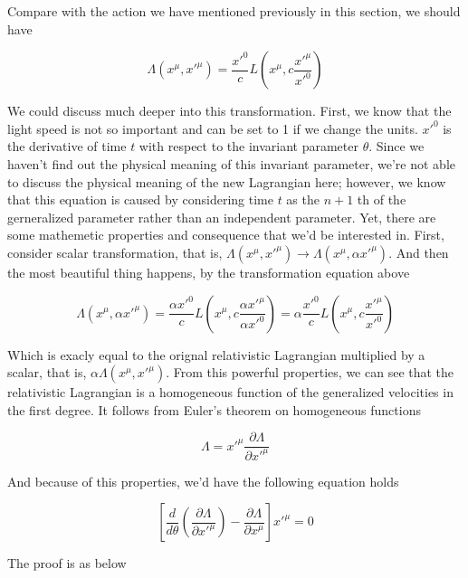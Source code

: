 \documentclass[12pt]{article}
\begin{document}
Compare with the action we have mentioned previously in this section, we should have

\begin{center}
    \[ \Lambda(x^{\mu}, x'^{\mu}) = \frac{x'^{0}}{c} L(x^{\mu}, c\frac{x'^{\mu}}{x'^{0}}) \]
\end{center}

We could discuss much deeper into this transformation. First, we know that the light speed is not so important and can be set to 1 if we change the units.
$x'^0$ is the derivative of time $t$ with respect to the invariant parameter $\theta$. Since we haven't find out the physical meaning of this invariant parameter, we're not able to discuss the physical meaning of the new Lagrangian here; however, we know that this equation is caused by considering time $t$ as the $n+1$ th of the gerneralized parameter rather than an independent parameter. Yet, there are some mathemetic properties and consequence that we'd be interested in. First, consider scalar transformation, that is, $\Lambda(x^{\mu}, x'^{\mu}) \rightarrow \Lambda(x^{\mu}, \alpha x'^{\mu})$. And then the most beautiful thing happens, by the transformation equation above

\begin{center}
    \[ \Lambda(x^{\mu}, \alpha x'^{\mu}) = \frac{\alpha x'^0}{c} L(x^{\mu}, c\frac{\alpha x'^{\mu}}{\alpha x'^0}) = \alpha \frac{x'^0}{c} L(x^{\mu}, c\frac{x'^{\mu}}{x'^0}) \]
\end{center}

Which is exacly equal to the orignal relativistic Lagrangian multiplied by a scalar, that is, $\alpha \Lambda(x^{\mu}, x'^{\mu})$. From this powerful properties, we can see that the relativistic Lagrangian is a homogeneous function of the generalized velocities in the first degree. It follows from Euler's theorem on homogeneous functions

\begin{center}
    \[ \Lambda = x'^{\mu} \frac{\partial \Lambda}{\partial x'^{\mu}} \]
\end{center}

And because of this properties, we'd have the following equation holds

\begin{center}
    \[ \left[\frac{d}{d \theta} \left( \frac{\partial \Lambda}{\partial x'^{\mu}} \right) - \frac{\partial \Lambda}{\partial x^{\mu}} \right] x'^{\mu} = 0 \]
\end{center}

The proof is as below
\end{document}
